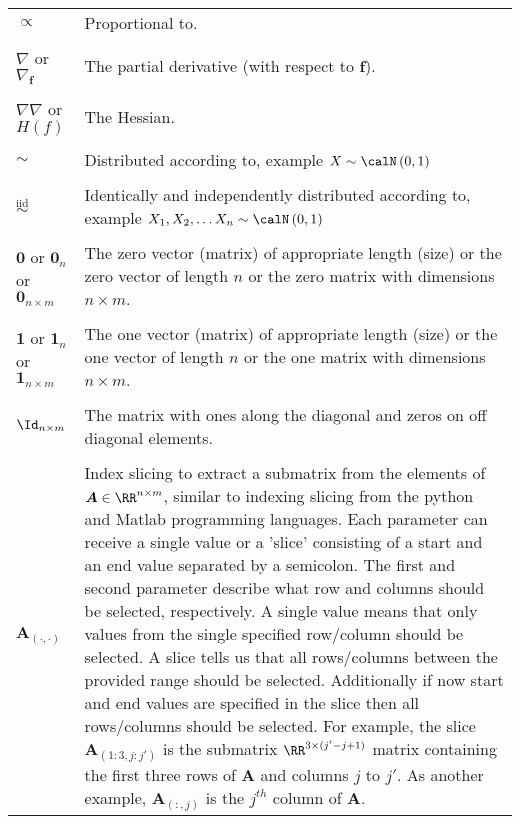 \begin{longtable}{lp{}}
    $\propto$                                         & Proportional to.
    \\\\
    $\nabla$ or $\nabla_{\bm{f}}$                     & The partial derivative (with respect to $\bm{f}$).
    \\\\
    $\nabla \nabla$ or $H(f)$                         & The Hessian.
    \\\\
    $\sim$                                            & Distributed according to, example $X \sim \calN \left( 0,1 \right)$
    \\\\
    $\overset{\text{iid}}{\sim}$                      & Identically and independently distributed according to, example $X_1 , X_2 , \ldots X_n \sim \calN \left( 0,1 \right)$
    \\\\
    $\bm{0}$ or $\bm{0}_{n}$ or $\bm{0}_{n \times m}$ & The zero vector (matrix) of appropriate length (size) or the zero vector of length $n$ or the zero matrix with dimensions $n \times m$.
    \\\\
    $\bm{1}$ or $\bm{1}_{n}$ or $\bm{1}_{n \times m}$ & The one vector (matrix) of appropriate length (size) or the one vector of length $n$ or the one matrix with dimensions $n \times m$.
    \\\\
    $\Id_{n \times m}$                                & The matrix with ones along the diagonal and zeros on off diagonal elements.
    \\\\
    $\bm{A}_{(\cdot,\cdot)}$                          & Index slicing to extract a submatrix from the elements of $\bm{A} \in \RR^{n \times m}$, similar to indexing slicing from the python and Matlab programming languages. Each parameter can receive a single value or a 'slice' consisting of a start and an end value separated by a semicolon. The first and second parameter describe what row and columns should be selected, respectively. A single value means that only values from the single specified row/column should be selected. A slice tells us that all rows/columns between the provided range should be selected. Additionally if now start and end values are specified in the slice then all rows/columns should be selected. For example, the slice $\bm{A}_{(1:3,j:j')}$ is the submatrix $\RR^{3 \times (j' - j + 1)}$ matrix containing the first three rows of $\bm{A}$ and columns $j$ to $j'$. As another example, $\bm{A}_{(:,j)}$ is the $j^{th}$ column of $\bm{A}$.

\end{longtable}
